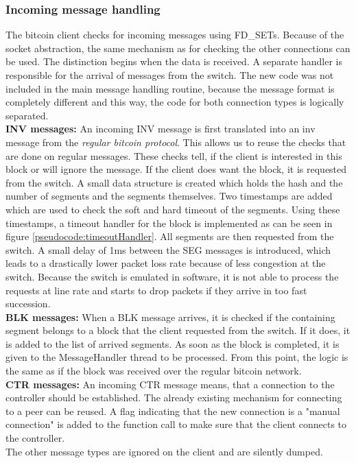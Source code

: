 \subsubsection{Incoming message handling}
The bitcoin client checks for incoming messages using FD\_SETs. Because of the socket abstraction, the same mechanism as for checking the other connections can be used. The distinction begins when the data is received. A separate handler is responsible for the arrival of messages from the switch. The new code was not included in the main message handling routine, because the message format is completely different and this way, the code for both connection types is logically separated. \\
\textbf{INV messages:} An incoming INV message is first translated into an inv message from the \textit{regular bitcoin protocol}. This allows us to reuse the checks that are done on regular messages. These checks tell, if the client is interested in this block or will ignore the message. \newline
If the client does want the block, it is requested from the switch. A small data structure is created which holds the hash and the number of segments and the segments themselves. Two timestamps are added which are used to check the soft and hard timeout of the segments. Using these timestamps, a timeout handler for the block is implemented as can be seen in figure \ref{pseudocode:timeoutHandler}. All segments are then requested from the switch. A small delay of 1ms between the SEG messages is introduced, which leads to a drastically lower packet loss rate because of less congestion at the switch. Because the switch is emulated in software, it is not able to process the requests at line rate and starts to drop packets if they arrive in too fast succession. \\
\textbf{BLK messages:} When a BLK message arrives, it is checked if the containing segment belongs to a block that the client requested from the switch. If it does, it is added to the list of arrived segments. As soon as the block is completed, it is given to the MessageHandler thread to be processed. From this point, the logic is the same as if the block was received over the regular bitcoin network. \\
\textbf{CTR messages:} An incoming CTR message means, that a connection to the controller should be established. The already existing mechanism for connecting to a peer can be reused. A flag indicating that the new connection is a "manual connection" is added to the function call to make sure that the client connects to the controller.\\  
The other message types are ignored on the client and are silently dumped.



